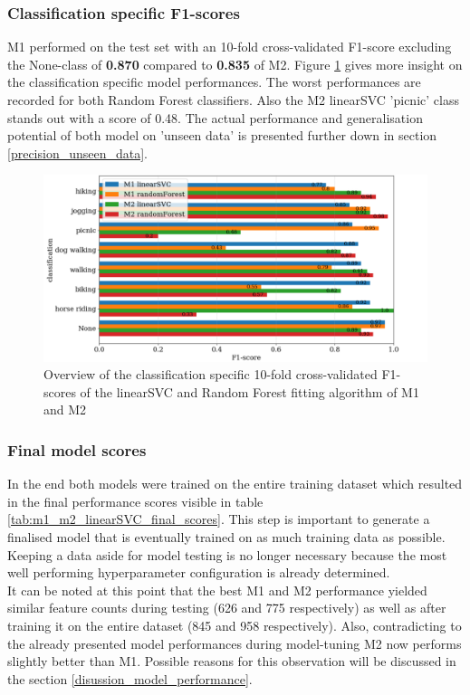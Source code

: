\subsubsection{Classification specific F1-scores}
M1 performed on the test set with an 10-fold cross-validated F1-score excluding the None-class of \textbf{0.870} compared to \textbf{0.835} of M2. Figure \ref{fig:m1_m2_class_f1_scores} gives more insight on the classification specific model performances. The worst performances are recorded for both Random Forest classifiers. Also the M2 linearSVC 'picnic' class stands out with a score of 0.48. The actual performance and generalisation potential of both model on 'unseen data' is presented further down in section \ref{precision_unseen_data}.

\begin{figure}[h!]
   \centering
   \includegraphics[width=\textwidth]{img/m1_m2_class_f1_scores_bigger_font.pdf}
   \caption{Overview of the classification specific 10-fold cross-validated F1-scores of the linearSVC and Random Forest fitting algorithm of M1 and M2}
   \label{fig:m1_m2_class_f1_scores}
\end{figure}

\subsubsection{Final model scores}
In the end both models were trained on the entire training dataset which resulted in the final performance scores visible in table \ref{tab:m1_m2_linearSVC_final_scores}. This step is important to generate a finalised model that is eventually trained on as much training data as possible. Keeping a data aside for model testing is no longer necessary because the most well performing hyperparameter configuration is already determined.\\
It can be noted at this point that the best M1 and M2 performance yielded similar feature counts during testing (626 and 775 respectively) as well as after training it on the entire dataset (845 and 958 respectively). Also, contradicting to the already presented model performances during model-tuning M2 now performs slightly better than M1. Possible reasons for this observation will be discussed in the section \ref{disussion_model_performance}.

